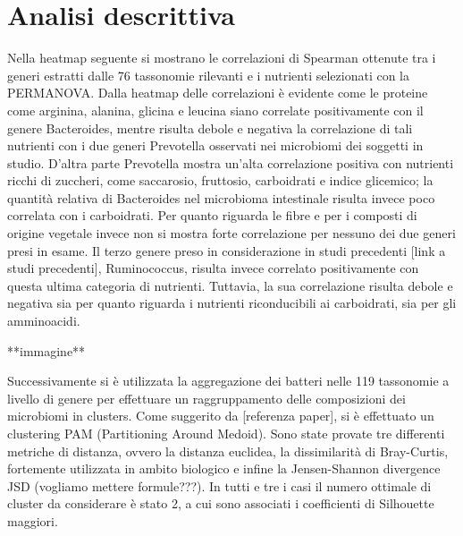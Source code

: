 \section{Analisi descrittiva}
Nella heatmap seguente si mostrano le correlazioni di Spearman ottenute tra i generi estratti dalle 76 tassonomie rilevanti e i nutrienti selezionati con la PERMANOVA. 
Dalla heatmap delle correlazioni è evidente come le proteine come arginina, alanina, glicina e leucina siano correlate positivamente con il genere Bacteroides, mentre risulta debole e negativa la correlazione di tali nutrienti con i due generi Prevotella osservati nei microbiomi dei soggetti in studio. D’altra parte Prevotella mostra un'alta correlazione positiva con nutrienti ricchi di zuccheri, come saccarosio, fruttosio, carboidrati e indice glicemico; la quantità relativa di Bacteroides nel microbioma intestinale risulta invece poco correlata con i carboidrati. Per quanto riguarda le fibre e per i composti di origine vegetale invece non si mostra forte correlazione per nessuno dei due generi presi in esame. Il terzo genere preso in considerazione in studi precedenti [link a studi precedenti], Ruminococcus, risulta invece correlato positivamente con questa ultima categoria di nutrienti. Tuttavia, la sua correlazione risulta debole e negativa sia per quanto riguarda i nutrienti riconducibili ai carboidrati, sia per gli amminoacidi.

**immagine**

Successivamente si è utilizzata la aggregazione dei batteri nelle 119 tassonomie a livello di genere per effettuare un raggruppamento delle composizioni dei microbiomi in clusters. Come suggerito da [referenza paper], si è effettuato un clustering PAM (Partitioning Around Medoid).
Sono state provate tre differenti metriche di distanza, ovvero la distanza euclidea, la dissimilarità di Bray-Curtis, fortemente utilizzata in ambito biologico e infine la Jensen-Shannon divergence JSD (vogliamo mettere formule???). In tutti e tre i casi il numero ottimale di cluster da considerare è stato 2, a cui sono associati i coefficienti di Silhouette maggiori. 

